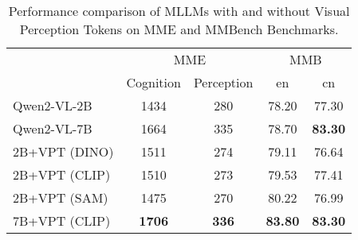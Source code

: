 \begin{table*}[t]
    \centering
    \begin{tabular}{@{}lcccc@{}}
    \toprule
    \multirow{2}{*}{} & \multicolumn{2}{c}{MME}      & \multicolumn{2}{c}{MMB}         \\ \cmidrule(l){2-5} 
                      & Cognition     & Perception   & en             & cn             \\ \midrule
    Qwen2-VL-2B       & 1434          & 280          & 78.20          & 77.30          \\
    Qwen2-VL-7B       & 1664          & 335          & 78.70          & \textbf{83.30} \\
    2B+VPT (DINO)     & 1511          & 274          & 79.11          & 76.64          \\
    2B+VPT (CLIP)     & 1510          & 273          & 79.53          & 77.41          \\
    2B+VPT (SAM)      & 1475          & 270          & 80.22          & 76.99          \\
    7B+VPT (CLIP)     & \textbf{1706} & \textbf{336} & \textbf{83.80} & \textbf{83.30} \\ \bottomrule
    \end{tabular}
    \caption{Performance comparison of MLLMs with and without Visual Perception Tokens on MME and MMBench Benchmarks.}
    \label{tab:benchmark}
\end{table*}